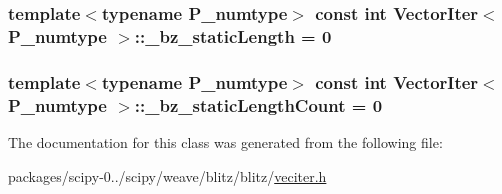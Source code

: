 \subsubsection[{\+\_\+bz\+\_\+static\+Length}]{\setlength{\rightskip}{0pt plus 5cm}template$<$typename P\+\_\+numtype$>$ const int {\bf Vector\+Iter}$<$ P\+\_\+numtype $>$\+::\+\_\+bz\+\_\+static\+Length = 0\hspace{0.3cm}{\ttfamily [static]}}\label{classVectorIter_af0a294e404a2578006da378ff14f4458}
\hypertarget{classVectorIter_a5c1484d75f0ef56a0e347a5cd654a1fd}{}
\subsubsection[{\+\_\+bz\+\_\+static\+Length\+Count}]{\setlength{\rightskip}{0pt plus 5cm}template$<$typename P\+\_\+numtype$>$ const int {\bf Vector\+Iter}$<$ P\+\_\+numtype $>$\+::\+\_\+bz\+\_\+static\+Length\+Count = 0\hspace{0.3cm}{\ttfamily [static]}}\label{classVectorIter_a5c1484d75f0ef56a0e347a5cd654a1fd}


The documentation for this class was generated from the following file\+:\begin{DoxyCompactItemize}
\item 
packages/scipy-\/0../scipy/weave/blitz/blitz/\hyperlink{veciter_8h}{veciter.\+h}\end{DoxyCompactItemize}
